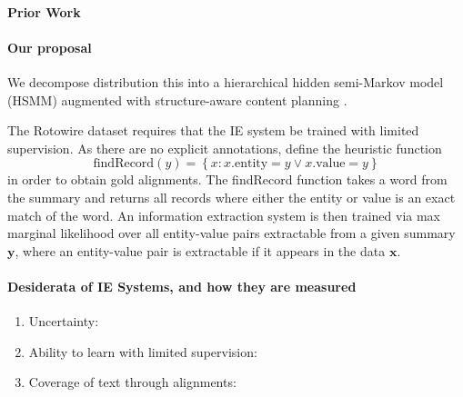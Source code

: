 \documentclass[11pt]{article}
\newcommand\set[1]{\left\{#1\right\}}
\newcommand{\bx}{\mathbf{x}}
\newcommand{\by}{\mathbf{y}}
\begin{document}
\paragraph{Prior Work}

\paragraph{Our proposal}
We decompose distribution this into a hierarchical hidden semi-Markov model (HSMM)
\citep{liang2009semalign} augmented with structure-aware content planning
\citep{sauper2009wiki}.



The Rotowire dataset requires that the IE system be trained with limited supervision.
As there are no explicit annotations, \citep{wiseman2017d2t} define the heuristic function
\begin{equation}
\text{findRecord}(y) = \set{ x : x.\text{entity} = y \vee x.\text{value} = y}
\end{equation}
in order to obtain gold alignments.
The findRecord function takes a word from the summary and returns all records where
either the entity or value is an exact match of the word.
An information extraction system is then trained via max marginal likelihood over
all entity-value pairs extractable from a given summary $\by$,
where an entity-value pair is extractable if it appears in the data $\bx$.

\paragraph{Desiderata of IE Systems, and how they are measured}
\begin{enumerate}
\item Uncertainty: 
\item Ability to learn with limited supervision:
\item Coverage of text through alignments:
\end{enumerate}
\end{document}
